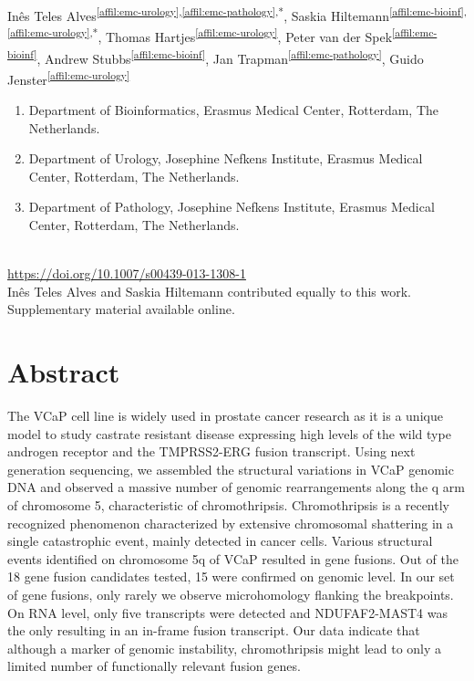 \setcounter{NAT@ctr}{-1}
{}
Inês Teles Alves\textsuperscript{\ref{affil:emc-urology},\ref{affil:emc-pathology},*},
Saskia Hiltemann\textsuperscript{\ref{affil:emc-bioinf},\ref{affil:emc-urology},*},
Thomas Hartjes\textsuperscript{\ref{affil:emc-urology}},
Peter van der Spek\textsuperscript{\ref{affil:emc-bioinf}},
Andrew Stubbs\textsuperscript{\ref{affil:emc-bioinf}},
Jan Trapman\textsuperscript{\ref{affil:emc-pathology}},
Guido Jenster\textsuperscript{\ref{affil:emc-urology}}

\small
\begin{enumerate}
\itemsep-0.5em
\item Department of Bioinformatics, Erasmus Medical Center, Rotterdam, The Netherlands. \label{affil:emc-bioinf}
\item Department of Urology, Josephine Nefkens Institute, Erasmus Medical Center, Rotterdam, The Netherlands. \label{affil:emc-urology}
\item Department of Pathology, Josephine Nefkens Institute, Erasmus Medical Center, Rotterdam, The Netherlands. \label{affil:emc-pathology}
\end{enumerate}


{\color{chaptergrey}{Published in: Human Genetics}} \\
{\color{chaptergrey}{DOI:}} \url{https://doi.org/10.1007/s00439-013-1308-1} \\
{\color{chaptergrey}{*:}} Inês Teles Alves and Saskia Hiltemann contributed equally to this work.\\
Supplementary material available online. \\

\normalsize

\section*{Abstract}
The VCaP cell line is widely used in prostate cancer research as it is a unique model to study castrate resistant disease expressing high levels of
the wild type androgen receptor and the TMPRSS2-ERG fusion transcript. Using next generation sequencing, we assembled the structural variations in
VCaP genomic DNA and observed a massive number of genomic rearrangements along the q arm of chromosome 5, characteristic of chromothripsis.
Chromothripsis is a recently recognized phenomenon characterized by extensive chromosomal shattering in a single catastrophic event, mainly detected
in cancer cells. Various structural events identified on chromosome 5q of VCaP resulted in gene fusions. Out of the 18 gene fusion candidates tested,
15 were confirmed on genomic level. In our set of gene fusions, only rarely we observe microhomology flanking the breakpoints. On RNA level, only five
transcripts were detected and NDUFAF2-MAST4 was the only resulting in an in-frame fusion transcript. Our data indicate that although a marker of genomic
instability, chromothripsis might lead to only a limited number of functionally relevant fusion genes.


